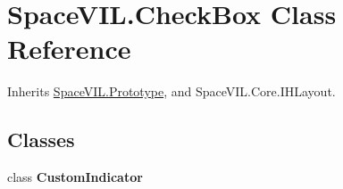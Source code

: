 \hypertarget{class_space_v_i_l_1_1_check_box}{}\section{Space\+V\+I\+L.\+Check\+Box Class Reference}
\label{class_space_v_i_l_1_1_check_box}


Inherits \mbox{\hyperlink{class_space_v_i_l_1_1_prototype}{Space\+V\+I\+L.\+Prototype}}, and Space\+V\+I\+L.\+Core.\+I\+H\+Layout.

\subsection*{Classes}
\begin{DoxyCompactItemize}
\item 
class {\bfseries Custom\+Indicator}
\end{DoxyCompactItemize}
